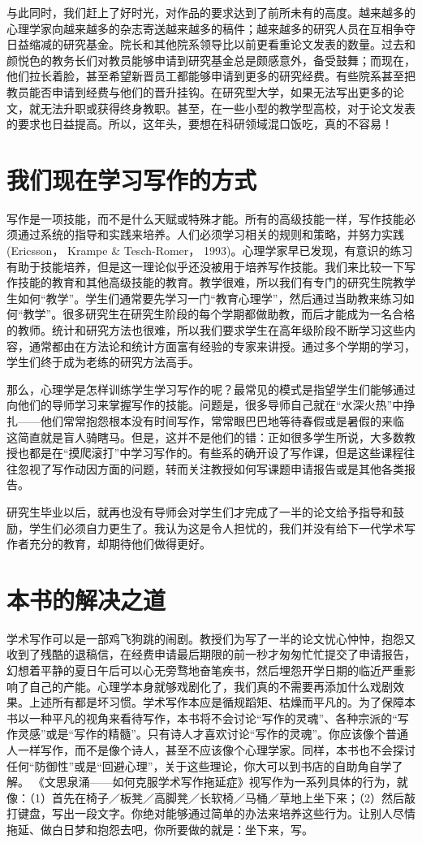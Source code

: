 与此同时，我们赶上了好时光，对作品的要求达到了前所未有的高度。越来越多的心理学家向越来越多的杂志寄送越来越多的稿件；越来越多的研究人员在互相争夺日益缩减的研究基金。院长和其他院系领导比以前更看重论文发表的数量。过去和颜悦色的教务长们对教员能够申请到研究基金总是颇感意外，备受鼓舞；而现在，他们拉长着脸，甚至希望新晋员工都能够申请到更多的研究经费。有些院系甚至把教员能否申请到经费与他们的晋升挂钩。在研究型大学，如果无法写出更多的论文，就无法升职或获得终身教职。甚至，在一些小型的教学型高校，对于论文发表的要求也日益提高。所以，这年头，要想在科研领域混口饭吃，真的不容易！


\section{我们现在学习写作的方式}
写作是一项技能，而不是什么天赋或特殊才能。所有的高级技能一样，写作技能必须通过系统的指导和实践来培养。人们必须学习相关的规则和策略，并努力实践 (Ericsson， Krampe \& Tesch-Romer， 1993)。心理学家早已发现，有意识的练习有助于技能培养，但是这一理论似乎还没被用于培养写作技能。我们来比较一下写作技能的教育和其他高级技能的教育。教学很难，所以我们有专门的研究生院教学生如何“教学”。学生们通常要先学习一门“教育心理学”，然后通过当助教来练习如何“教学”。很多研究生在研究生阶段的每个学期都做助教，而后才能成为一名合格的教师。统计和研究方法也很难，所以我们要求学生在高年级阶段不断学习这些内容，通常都由在方法论和统计方面富有经验的专家来讲授。通过多个学期的学习，学生们终于成为老练的研究方法高手。

那么，心理学是怎样训练学生学习写作的呢？最常见的模式是指望学生们能够通过向他们的导师学习来掌握写作的技能。问题是，很多导师自己就在“水深火热”中挣扎——他们常常抱怨根本没有时间写作，常常眼巴巴地等待春假或是暑假的来临 这简直就是盲人骑瞎马。但是，这并不是他们的错：正如很多学生所说，大多数教授也都是在“摸爬滚打”中学习写作的。有些系的确开设了写作课，但是这些课程往往忽视了写作动因方面的问题，转而关注教授如何写课题申请报告或是其他各类报告。

研究生毕业以后，就再也没有导师会对学生们才完成了一半的论文给予指导和鼓励，学生们必须自力更生了。我认为这是令人担忧的，我们并没有给下一代学术写作者充分的教育，却期待他们做得更好。


\section{本书的解决之道}
学术写作可以是一部鸡飞狗跳的闹剧。教授们为写了一半的论文忧心忡忡，抱怨又收到了残酷的退稿信，在经费申请最后期限的前一秒才匆匆忙忙提交了申请报告，幻想着平静的夏日午后可以心无旁骛地奋笔疾书，然后埋怨开学日期的临近严重影响了自己的产能。心理学本身就够戏剧化了，我们真的不需要再添加什么戏剧效果。上述所有都是坏习惯。学术写作本应是循规蹈矩、枯燥而平凡的。为了保障本书以一种平凡的视角来看待写作，本书将不会讨论“写作的灵魂”、各种宗派的“写作灵感”或是“写作的精髓”。只有诗人才喜欢讨论“写作的灵魂”。你应该像个普通人一样写作，而不是像个诗人，甚至不应该像个心理学家。同样，本书也不会探讨任何“防御性”或是“回避心理”，关于这些理论，你大可以到书店的自助角自学了解。 《文思泉涌——如何克服学术写作拖延症》视写作为一系列具体的行为，就像：（1）首先在椅子／板凳／高脚凳／长软椅／马桶／草地上坐下来；（2）然后敲打键盘，写出一段文字。你绝对能够通过简单的办法来培养这些行为。让别人尽情拖延、做白日梦和抱怨去吧，你所要做的就是：坐下来，写。

